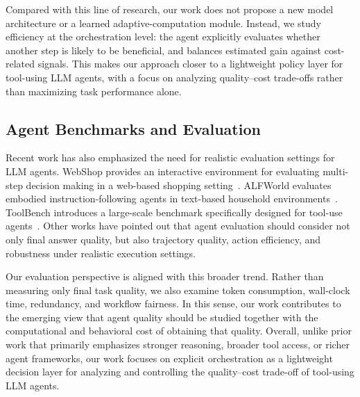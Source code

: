 Compared with this line of research, our work does not propose a new model architecture or a learned adaptive-computation module. Instead, we study efficiency at the orchestration level: the agent explicitly evaluates whether another step is likely to be beneficial, and balances estimated gain against cost-related signals. This makes our approach closer to a lightweight policy layer for tool-using LLM agents, with a focus on analyzing quality--cost trade-offs rather than maximizing task performance alone.

\subsection{Agent Benchmarks and Evaluation}

Recent work has also emphasized the need for realistic evaluation settings for LLM agents. WebShop provides an interactive environment for evaluating multi-step decision making in a web-based shopping setting~\cite{yao2022webshop}. ALFWorld evaluates embodied instruction-following agents in text-based household environments~\cite{shridhar2021alfworld}. ToolBench introduces a large-scale benchmark specifically designed for tool-use agents~\cite{qin2023toolbench}. Other works have pointed out that agent evaluation should consider not only final answer quality, but also trajectory quality, action efficiency, and robustness under realistic execution settings.

Our evaluation perspective is aligned with this broader trend. Rather than measuring only final task quality, we also examine token consumption, wall-clock time, redundancy, and workflow fairness. In this sense, our work contributes to the emerging view that agent quality should be studied together with the computational and behavioral cost of obtaining that quality.
Overall, unlike prior work that primarily emphasizes stronger reasoning, broader tool access, or richer agent frameworks, our work focuses on explicit orchestration as a lightweight decision layer for analyzing and controlling the quality--cost trade-off of tool-using LLM agents.